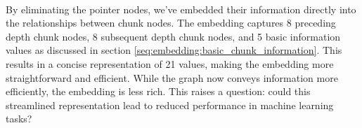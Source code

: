         \paragraph{}By eliminating the pointer nodes, we've embedded their information directly into the relationships between chunk nodes. The embedding captures 8 preceding depth chunk nodes, 8 subsequent depth chunk nodes, and 5 basic information values as discussed in section \ref{seq:embedding:basic_chunk_information}. This results in a concise representation of 21 values, making the embedding more straightforward and efficient. While the graph now conveys information more efficiently, the embedding is less rich. This raises a question: could this streamlined representation lead to reduced performance in machine learning tasks?